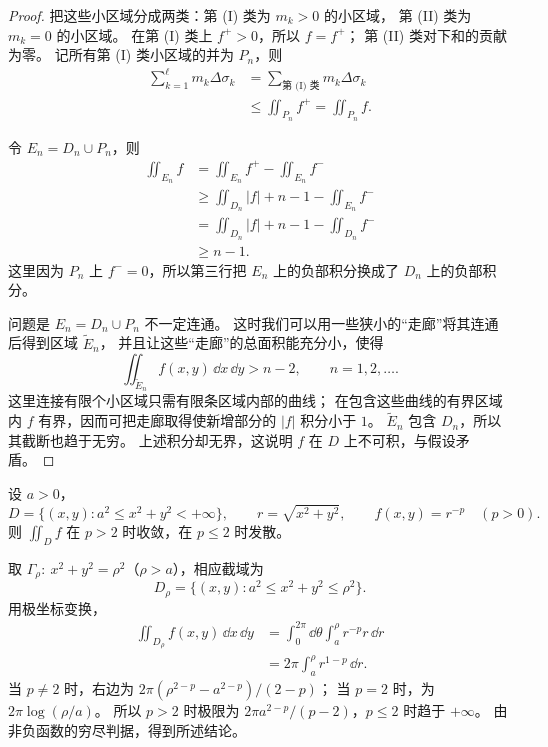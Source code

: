 \begin{proof}
把这些小区域分成两类：第 (I) 类为 $m_k>0$ 的小区域，
第 (II) 类为 $m_k=0$ 的小区域。
在第 (I) 类上 $f^+>0$，所以 $f=f^+$；
第 (II) 类对下和的贡献为零。
记所有第 (I) 类小区域的并为 $P_n$，则
\begin{align*}
\sum_{k=1}^{\ell}m_k\Delta\sigma_k
&=\sum_{\text{第 (I) 类}}m_k\Delta\sigma_k\\
&\le\displaystyle\iint_{P_n}f^+
=\displaystyle\iint_{P_n}f.
\end{align*}

令 $E_n=D_n\cup P_n$，则
\begin{align*}
\displaystyle\iint_{E_n}f
&=\displaystyle\iint_{E_n}f^+-\displaystyle\iint_{E_n}f^-\\
&\ge\displaystyle\iint_{D_n}|f|+n-1-\displaystyle\iint_{E_n}f^-\\
&=\displaystyle\iint_{D_n}|f|+n-1-\displaystyle\iint_{D_n}f^-\\
&\ge n-1.
\end{align*}
这里因为 $P_n$ 上 $f^-=0$，所以第三行把 $E_n$ 上的负部积分换成了 $D_n$ 上的负部积分。

问题是 $E_n=D_n\cup P_n$ 不一定连通。
这时我们可以用一些狭小的“走廊”将其连通后得到区域 $\widetilde E_n$，
并且让这些“走廊”的总面积能充分小，使得
\[
\displaystyle\iint_{\widetilde E_n}f(x,y)\,\dd x\,\dd y>n-2,
\qquad n=1,2,\ldots.
\]
这里连接有限个小区域只需有限条区域内部的曲线；
在包含这些曲线的有界区域内 $f$ 有界，因而可把走廊取得使新增部分的 $|f|$ 积分小于 $1$。
$\widetilde E_n$ 包含 $D_n$，所以其截断也趋于无穷。
上述积分却无界，这说明 $f$ 在 $D$ 上不可积，与假设矛盾。
\end{proof}


\begin{example}[无穷远处的幂函数]
设 $a>0$，
\[
D=\{(x,y):a^2\le x^2+y^2<+\infty\},\qquad
r=\sqrt{x^2+y^2},\qquad f(x,y)=r^{-p}\quad(p>0).
\]
则 $\displaystyle\iint_Df$ 在 $p>2$ 时收敛，在 $p\le2$ 时发散。
\end{example}
\begin{solution}
取 $\Gamma_\rho:\ x^2+y^2=\rho^2$（$\rho>a$），相应截域为
\[
D_\rho=\{(x,y):a^2\le x^2+y^2\le\rho^2\}.
\]
用极坐标变换，
\begin{align*}
\displaystyle\iint_{D_\rho}f(x,y)\,\dd x\,\dd y
&=\int_0^{2\pi}\dd\theta\int_a^\rho r^{-p}r\,\dd r\\
&=2\pi\int_a^\rho r^{1-p}\,\dd r.
\end{align*}
当 $p\ne2$ 时，右边为 $2\pi(\rho^{2-p}-a^{2-p})/(2-p)$；
当 $p=2$ 时，为 $2\pi\log(\rho/a)$。
所以 $p>2$ 时极限为 $2\pi a^{2-p}/(p-2)$，$p\le2$ 时趋于 $+\infty$。
由非负函数的穷尽判据，得到所述结论。
\end{solution}

